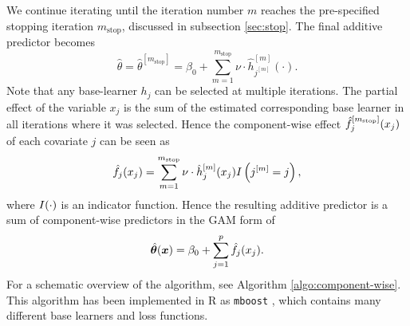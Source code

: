 We continue iterating until the iteration number $m$ reaches the pre-specified stopping iteration $m_{\text{stop}}$, discussed in subsection \ref{sec:stop}.
The final additive predictor becomes
\begin{equation*}
    \hat{\theta}=\hat{\theta}^{[m_{\text{stop}}]}=\beta_0 + \sum_{m=1}^{m_{\text{stop}}}\nu\cdot\hat{h}_{j^{[m]}}^{[m]}(\cdot).
\end{equation*}
Note that any base-learner $h_j$ can be selected at multiple iterations.
The partial effect of the variable $x_j$ is the sum of the estimated corresponding base learner in all iterations where it was selected.
Hence the component-wise effect $\hat{f}_j^{[m_{\text{stop}}]}(x_j)$ of each covariate $j$ can be seen as
\begin{equation*}
    \hat{f}_j(x_j)=\sum_{m=1}^{m_{\text{stop}}}\nu\cdot\hat{h}_j^{[m]}(x_j)I\left(j^{[m]}=j\right),
\end{equation*}
where $I(\cdot)$ is an indicator function.
Hence the resulting additive predictor is a sum of component-wise predictors in the GAM form of
\begin{equation*}
    \hat{\boldsymbol{\theta}}(\bm{x})=\beta_0+\sum_{j=1}^p \hat{f}_j(x_j).
\end{equation*}
For a schematic overview of the algorithm, see Algorithm \ref{algo:component-wise}.
This algorithm has been implemented in R as \verb|mboost| \citep{mboost, mboost1, mboost2}, which contains many different base learners and loss functions.

